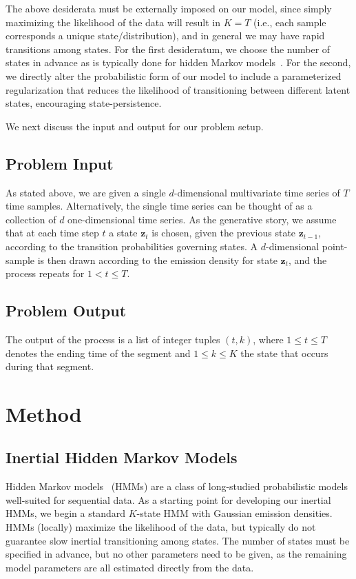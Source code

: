 \documentclass[letterpaper]{article}
\begin{document}
The above desiderata must be externally imposed on our model, since simply maximizing the likelihood of the data will result in $K = T$ (i.e., each sample corresponds a unique state/distribution), and in general we may have rapid transitions among states. For the first desideratum,  we choose the number of states in advance as is typically done for hidden Markov models~\cite{rabiner1989tutorial}. For the second, we directly alter the probabilistic form of our model to include a parameterized regularization that reduces the likelihood of transitioning between different latent states, encouraging state-persistence.

We next discuss the input and output for our problem setup.

\subsection{Problem Input}

As stated above, we are given a single $d$-dimensional multivariate time series of $T$ time samples. Alternatively, the single time series can be thought of as a collection of $d$ one-dimensional time series. As the generative story, we assume that at each time step $t$ a state $\mathbf{z}_t$ is chosen, given the previous state $\mathbf{z}_{t-1}$, according to the transition probabilities governing states. A $d$-dimensional point-sample is then drawn according to the emission density for state $\mathbf{z}_t$, and the process repeats for $1 < t \leq T$.

\subsection{Problem Output}

The output of the process is a list of integer tuples $(t, k)$, where $1 \leq t \leq T$ denotes the ending time of the segment and $1 \leq k \leq K$ the state that occurs during that segment. 

\section{Method}

\subsection{Inertial Hidden Markov Models}

Hidden Markov models~\cite{rabiner1989tutorial} (HMMs) are a class of long-studied probabilistic models well-suited for sequential data. As a starting point for developing our inertial HMMs, we begin a standard $K$-state HMM with Gaussian emission densities. HMMs (locally) maximize the likelihood of the data, but typically do not guarantee slow inertial transitioning among states. The number of states must be specified in advance, but no other parameters need to be given, as the remaining model parameters are all estimated directly from the data. 
\end{document}

